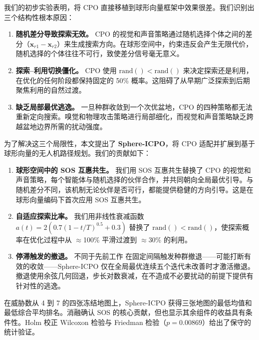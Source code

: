 \documentclass[11pt,a4paper]{ctexart}
\begin{document}
我们的初步实验表明，将 CPO 直接移植到球形向量框架中效果很差。我们识别出三个结构性根本原因：

\begin{enumerate}
    \item \textbf{随机差分导致探索无效。} CPO 的视觉和声音策略通过随机选择个体之间的差分（$\mathbf{x}_{r1} - \mathbf{x}_{r2}$）来生成搜索方向。在球形空间中，约束违反会产生无限代价，随机选择的个体往往不可行，致使差分信号毫无意义。

    \item \textbf{探索--利用切换僵化。} CPO 使用 $\text{rand}() < \text{rand}()$ 来决定探索还是利用，在优化的任何阶段都保持固定的 50\% 概率。这阻碍了从早期广泛探索到后期聚焦利用的自然过渡。

    \item \textbf{缺乏局部最优逃逸。} 一旦种群收敛到一个次优盆地，CPO 的四种策略都无法重新定向搜索。嗅觉和物理攻击策略进行局部细化，而视觉和声音策略缺乏跨越盆地边界所需的扰动强度。
\end{enumerate}

为了解决这三个局限性，本文提出了 \textbf{Sphere-ICPO}，将 CPO 适配并扩展到基于球形向量的无人机路径规划。我们的贡献如下：

\begin{enumerate}
    \item \textbf{球形空间中的 SOS 互惠共生。} 我们用 SOS 互惠共生替换了 CPO 的视觉和声音策略，每个智能体与随机选择的伙伴合作，并共同朝向全局最优引导。与随机差分不同，该机制无论伙伴是否可行，都能提供稳健的方向引导。这是在球形向量编码下首次应用 SOS 互惠共生。

    \item \textbf{自适应探索比率。} 我们用非线性衰减函数 $a(t) = 2\left(0.7(1 - t/T)^{0.5} + 0.3\right)$ 替换了 $\text{rand}() < \text{rand}()$，使探索概率在优化过程中从 $\approx$100\% 平滑过渡到 $\approx$30\% 的利用。

    \item \textbf{停滞触发的撤退。} 不同于先前工作 \cite{icpo2024} 在固定间隔触发种群撤退——可能打断有效的收敛——Sphere-ICPO 仅在全局最优连续五个迭代未改善时才激活撤退。撤退使用余弦几何回退，步长对数衰减，在不造成不必要扰动的前提下提供有针对性的逃逸。
\end{enumerate}

在威胁数从 4 到 7 的四张冻结地图上，Sphere-ICPO 获得三张地图的最低均值和最低综合平均排名。消融确认 SOS 的核心贡献，但也显示其余组件的收益具有条件性。Holm 校正 Wilcoxon 检验与 Friedman 检验（$p=0.00869$）给出了保守的统计验证。
\end{document}
